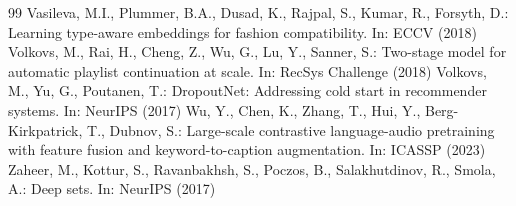 \documentclass[runningheads]{llncs}
\begin{document}
\begin{thebibliography}{99}
 Vasileva, M.I., Plummer, B.A., Dusad, K., Rajpal, S., Kumar, R., Forsyth, D.: Learning type-aware embeddings for fashion compatibility. In: ECCV (2018)
 Volkovs, M., Rai, H., Cheng, Z., Wu, G., Lu, Y., Sanner, S.: Two-stage model for automatic playlist continuation at scale. In: RecSys Challenge (2018)
 Volkovs, M., Yu, G., Poutanen, T.: DropoutNet: Addressing cold start in recommender systems. In: NeurIPS (2017)
 Wu, Y., Chen, K., Zhang, T., Hui, Y., Berg-Kirkpatrick, T., Dubnov, S.: Large-scale contrastive language-audio pretraining with feature fusion and keyword-to-caption augmentation. In: ICASSP (2023)
 Zaheer, M., Kottur, S., Ravanbakhsh, S., Poczos, B., Salakhutdinov, R., Smola, A.: Deep sets. In: NeurIPS (2017)
\end{thebibliography}
\end{document}
